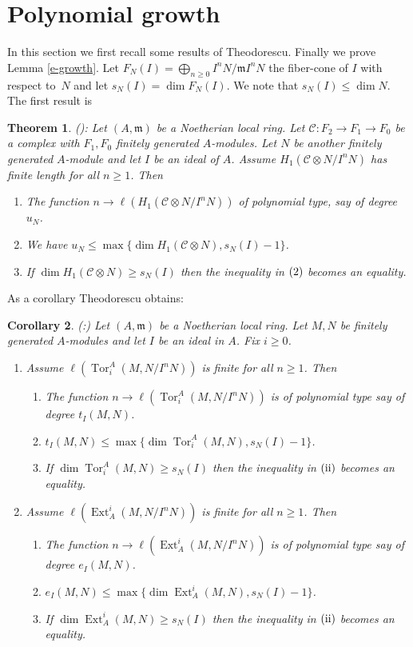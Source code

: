 \documentclass{amsart}
\newcommand{\wrt}{with respect to}
\newcommand{\m}{\mathfrak{m} }
\newcommand{\rt}{\rightarrow}
\newcommand{\Tor}{\operatorname{Tor}}
\newcommand{\Ext}{\operatorname{Ext}}
\theoremstyle{plain}
\newtheorem{theorem}{Theorem}[section]
\newtheorem{corollary}[theorem]{Corollary}
\theoremstyle{definition}
\theoremstyle{remark}
\begin{document}
\section{Polynomial growth}
In this section we first recall some results of Theodorescu. Finally we prove Lemma \ref{e-growth}. Let $F_N(I) = \bigoplus_{n \geq 0}I^nN/\m I^nN$  the fiber-cone of $I$ \wrt \ $N$ and let  $s_N(I) = \dim F_N(I)$. We note that $s_N(I) \leq \dim N$.
The first result is
\begin{theorem}\label{complex}(\cite[Proposition 3]{Theo}):
Let $(A, \m)$ be  a Noetherian local ring. Let $\mathcal{C} \colon F_2 \rt F_1 \rt F_0$ be a complex with $F_1, F_0$ finitely generated $A$-modules. Let
$N$ be another finitely generated $A$-module and let $I$ be an ideal of $A$.
Assume $H_1(\mathcal{C} \otimes N/I^nN)$ has finite length for all $n \geq 1$. Then
\begin{enumerate}[\rm (1)]
  \item The function $n \rt \ell(H_1(\mathcal{C} \otimes N/I^n N))$ of polynomial type, say of degree $u_N$.
  \item We have $u_N \leq \max \{ \dim H_1(\mathcal{C} \otimes N), s_N(I) -1 \}$.
  \item If $\dim H_1(\mathcal{C} \otimes N)\geq s_N(I) $ then the inequality in $\rm{(2)}$ becomes an equality.
\end{enumerate}
\end{theorem}

As a corollary Theodorescu obtains:
\begin{corollary}
\label{tor-ext-deg}(\cite[Corollary 4]{Theo}:) Let $(A, \m)$ be  a Noetherian local ring. Let $M, N$ be finitely generated $A$-modules and let $I$ be an ideal in $A$. Fix $i \geq 0$.
\begin{enumerate}[\rm (I)]
  \item Assume $\ell(\Tor^A_i(M, N/I^n N))$ is finite for all $n \geq 1$. Then
  \begin{enumerate}[\rm (i)]
    \item The function $n \rt \ell(\Tor^A_i(M, N/I^n N))$ is of polynomial type say of degree $t_I(M, N)$.
    \item $t_I(M, N) \leq \max \{ \dim \Tor^A_i(M, N), s_N(I) - 1\}$.
    \item If $\dim \Tor^A_i(M, N) \geq s_N(I)$ then the inequality in $\rm{(ii)}$ becomes an equality.
  \end{enumerate}
  \item Assume $\ell(\Ext^i_A(M, N/I^n N))$ is finite for all $n \geq 1$. Then
  \begin{enumerate}[\rm (i)]
    \item The function $n \rt \ell(\Ext^i_A(M, N/I^n N))$ is of polynomial type say of degree $e_I(M, N)$.
    \item $e_I(M, N) \leq \max \{ \dim \Ext^i_A(M, N), s_N(I) - 1\}$.
    \item If $\dim \Ext^i_A(M, N) \geq s_N(I)$ then the inequality in $\rm{(ii)}$ becomes an equality.
  \end{enumerate}
\end{enumerate}
\end{corollary}
\end{document}
